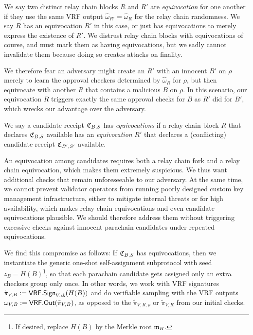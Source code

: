 We say two distinct relay chain blocks $R$ and $R'$ are {\em equivocation} for one another if they use the same VRF output $\hat{\omega}_{R'} = \hat{\omega}_R$ for the relay chain randomness.  We say $R$ has an equivocation $R'$ in this case, or just has equivocations to merely express the existence of $R'$.
%
We distrust relay chain blocks with equivocations of course, and must mark them as having equivocations, but we sadly cannot invalidate them because doing so creates attacks on finality. 

We therefore fear an adversary might create an $R'$ with an innocent $B'$ on $\rho$ merely to learn the approval checkers determined by $\hat{\omega}_R$ for $\rho$, but then equivocate with another $R$ that contains a malicious $B$ on $\rho$.  In this scenario, our equivocation $R$ triggers exactly the same approval checks for $B$ as $R'$ did for $B'$, which wrecks our advantage over the adversary.

We say a candidate receipt $\mathfrak{C}_{B,S}$ has {\em equivocations} if a relay chain block $R$ that declares $\mathfrak{C}_{B,S}$ available has an {\em equivocation} $R'$ that declares a (conflicting) candidate receipt $\mathfrak{C}_{B',S'}$ available.

An equivocation among candidates requires both a relay chain fork and a relay chain equivocation, which makes them extremely suspicious.  We thus want additional checks that remain unforeseeable to our adversary.  
%
At the same time, we cannot prevent validator operators from running poorly designed custom key management infrastructure, either to mitigate internal threats or for high availability, which makes relay chain equivocations and even candidate equivocations plausible.  We should therefore address them without triggering excessive checks against innocent parachain candidates under repeated equivocations.

We find this compromise as follows:  If $\mathfrak{C}_{B,S}$ has equivocations, then we instantiate the generic one-shot self-assignment subprotocol with seed $z_B = H(B)$\footnote{If desired, replace $H(B)$ by the Merkle root $\mathfrak{m}_B$.}, so that each parachain candidate gets assigned only an extra checkers group only once.  In other words, we work with VRF signatures $\tilde{\pi}_{V,B} := \mathsf{VRF}.\mathsf{Sign}_{V.\mathsf{sk}}(H(B))$ and do verifiable sampling with the VRF outputs $\omega_{V,B} := \mathsf{VRF}.\mathsf{Out}(\tilde{\pi}_{V,B})$, as opposed to the $\tilde{\pi}_{V,R,\rho}$ or $\tilde{\pi}_{V,R}$ from our initial checks.

